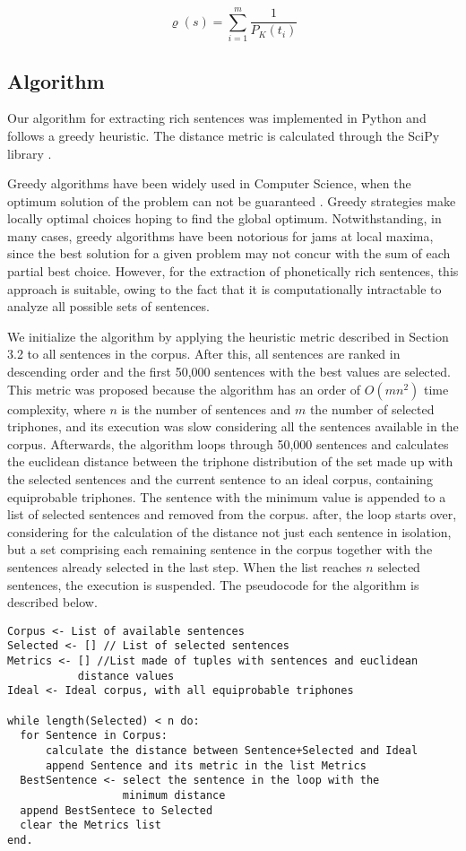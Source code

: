 \begin{equation}
\varrho(s) = \sum_{i=1}^{m} \frac{1}{P_K(t_i)}
\end{equation}


\subsection{Algorithm}

Our algorithm for extracting rich sentences was implemented in Python and follows a greedy heuristic. The distance
metric is calculated through the SciPy library \cite{Scipy2014}.

Greedy algorithms have been widely used in Computer Science, when the optimum solution of the problem can 
not be guaranteed \cite{Coppin2010}. Greedy strategies  make locally optimal choices hoping to find the global 
optimum. Notwithstanding, in many cases, greedy algorithms have been notorious for jams at local maxima, since the best solution 
for a given problem may not concur with the sum of each partial best choice. However, for the extraction of
phonetically rich sentences, this approach is suitable, owing to the fact that it is computationally intractable
to analyze all possible sets of sentences.

We initialize the algorithm by applying the heuristic metric described in Section 3.2 to all sentences in the 
corpus. After this, all sentences are ranked in descending order and the first 50,000 sentences with 
the best values are selected. This metric was proposed because the algorithm has an order of $O(mn^2)$ time complexity, 
where $n$ is the number of sentences and $m$ the number of selected triphones, and its execution was slow considering
all the sentences available in the corpus. Afterwards, the algorithm loops through 50,000 sentences and calculates 
the euclidean distance between the triphone distribution of the set made up with the selected sentences and the current sentence to an ideal corpus, containing equiprobable triphones. The sentence with the minimum value is appended to a list 
of selected sentences and removed from the corpus. after, the loop starts over, considering for the 
calculation of the distance not just each sentence in isolation, but a set comprising each remaining 
sentence in the corpus together with the sentences already selected in the last step. When the list reaches 
$n$ selected sentences, the execution is suspended. The pseudocode for the algorithm is described below.

\noindent
\begin{verbatim}
Corpus <- List of available sentences
Selected <- [] // List of selected sentences
Metrics <- [] //List made of tuples with sentences and euclidean 
           distance values
Ideal <- Ideal corpus, with all equiprobable triphones

while length(Selected) < n do:
  for Sentence in Corpus:
      calculate the distance between Sentence+Selected and Ideal
      append Sentence and its metric in the list Metrics
  BestSentence <- select the sentence in the loop with the
                  minimum distance
  append BestSentece to Selected
  clear the Metrics list
end.
\end{verbatim}
%
\noindent



